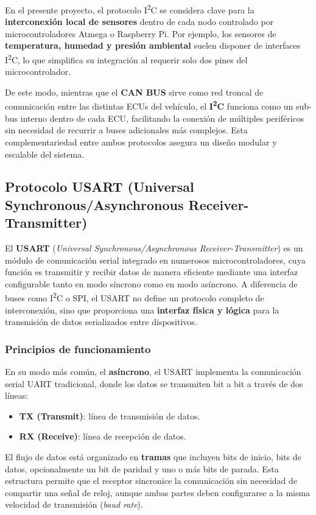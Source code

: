 En el presente proyecto, el protocolo I\textsuperscript{2}C se considera clave para la \textbf{interconexión local de sensores} dentro de cada nodo controlado por microcontroladores Atmega o Raspberry Pi. Por ejemplo, los sensores de \textbf{temperatura, humedad y presión ambiental} suelen disponer de interfaces I\textsuperscript{2}C, lo que simplifica su integración al requerir solo dos pines del microcontrolador.

De este modo, mientras que el \textbf{CAN BUS} sirve como red troncal de comunicación entre las distintas ECUs del vehículo, el \textbf{I\textsuperscript{2}C} funciona como un sub-bus interno dentro de cada ECU, facilitando la conexión de múltiples periféricos sin necesidad de recurrir a buses adicionales más complejos. Esta complementariedad entre ambos protocolos asegura un diseño modular y escalable del sistema.
\subsection{Protocolo USART (Universal Synchronous/Asynchronous Receiver-Transmitter)}

El \textbf{USART} (\textit{Universal Synchronous/Asynchronous Receiver-Transmitter}) es un módulo de comunicación serial integrado en numerosos microcontroladores, cuya función es transmitir y recibir datos de manera eficiente mediante una interfaz configurable tanto en modo síncrono como en modo asíncrono. A diferencia de buses como I\textsuperscript{2}C o SPI, el USART no define un protocolo completo de interconexión, sino que proporciona una \textbf{interfaz física y lógica} para la transmisión de datos serializados entre dispositivos.

\subsubsection*{Principios de funcionamiento}

En su modo más común, el \textbf{asíncrono}, el USART implementa la comunicación serial UART tradicional, donde los datos se transmiten bit a bit a través de dos líneas:
\begin{itemize}
    \item \textbf{TX (Transmit)}: línea de transmisión de datos.
    \item \textbf{RX (Receive)}: línea de recepción de datos.
\end{itemize}

El flujo de datos está organizado en \textbf{tramas} que incluyen bits de inicio, bits de datos, opcionalmente un bit de paridad y uno o más bits de parada. Esta estructura permite que el receptor sincronice la comunicación sin necesidad de compartir una señal de reloj, aunque ambas partes deben configurarse a la misma velocidad de transmisión (\textit{baud rate}).

